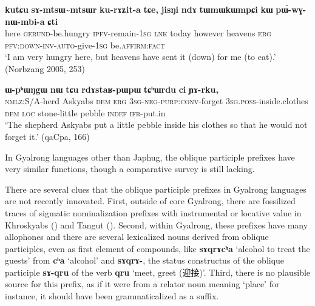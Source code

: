 \documentclass[oneside,a4paper,11pt]{article}
\newcommand{\ipa}[1]{\textbf{{\phon\mbox{#1}}}} %
\newcommand{\zh}[1]{{\cn #1}}
\begin{document}
\begin{exe}
\ex \label{ex:sAmtsWmtsWr}
\gll  \ipa{kutɕu}  	\ipa{sɤ-mtsɯ\textasciitilde{}mtsɯr}  	\ipa{ku-rɤʑit-a}  	\ipa{tɕe,}  	\ipa{jisŋi}  	\ipa{ndɤ}  	\ipa{tɯmɯkɯmpɕi}  	\ipa{kɯ}  	\ipa{pɯ́-wɣ-nɯ-mbi-a}  	\ipa{ɕti}  \\
 here \textsc{gerund}-be.hungry \textsc{ipfv}-remain-\textsc{1sg} \textsc{lnk} today however heavens \textsc{erg} \textsc{pfv:down-inv-auto}-give-\textsc{1sg} be.\textsc{affirm}:\textsc{fact} \\
\glt `I am very hungry here, but heavens have sent it (down) for  me (to eat).' (Norbzang 2005, 253)
\end{exe}

\begin{exe}
\ex \label{ex:WmAYWsAjmWjmWt}
\gll
[\ipa{kɯ-lɤɣ}   	\ipa{acɤβ}   	\ipa{nɯ}   	\ipa{kɯ}   	\ipa{\textbf{ɯ-mɤ-sɤ-jmɯ\textasciitilde{}jmɯt}},]   	\ipa{ɯ-pʰɯŋgɯ}   	\ipa{nɯ}   	\ipa{tɕu}   	\ipa{rdɤstaʁ-pɯpɯ}   	\ipa{tɕʰɯrdu}   	\ipa{ci}  \ipa{ɲɤ-rku,}\\
 \textsc{nmlz}:S/A-herd Askyabs \textsc{dem} \textsc{erg}  \textsc{3sg-neg-purp:conv}-forget \textsc{3sg.poss}-inside.clothes \textsc{dem} \textsc{loc} stone-little pebble \textsc{indef}
 \textsc{ifr}-put.in\\
\glt `The shepherd Askyabs put a little pebble inside his clothes so that he would not forget it.' (qaCpa, 166)
\end{exe}

In Gyalrong languages other than Japhug, the oblique participle prefixes have very similar functions, though a comparative survey is still lacking. 

There are several clues that the oblique participle prefixes in Gyalrong languages are not recently innovated. First, outside of core Gyalrong, there are fossilized traces of sigmatic nominalization prefixes with instrumental or locative value in Khroskyabs (\citealt[511]{lai17khroskyabs}) and Tangut (\citealt[256-257]{jacques14esquisse}). Second, within Gyalrong, these prefixes have many allophones and there are several lexicalized nouns derived from oblique participles, even as first element of compounds, like \ipa{sɤqrɤcʰa} `alcohol to treat the guests' from \ipa{cʰa} `alcohol' and \ipa{sɤqrɤ-}, the status constructus of the oblique participle \ipa{sɤ-qru} of the verb \ipa{qru} `meet, greet (\zh{迎接})'. Third, there is no plausible source for this prefix, as if it were from a relator noun meaning `place' for instance, it should have been grammaticalized as a suffix.
\end{document}
